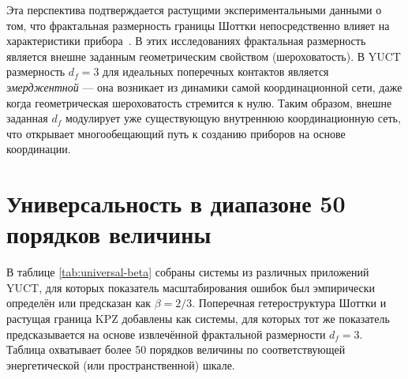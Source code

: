 \documentclass[12pt,a4paper]{article}
\begin{document}
	Эта перспектива подтверждается растущими экспериментальными данными о том,
	что фрактальная размерность границы Шоттки непосредственно влияет на
	характеристики прибора~\cite{FractalSchottky}. В этих исследованиях
	фрактальная размерность является внешне заданным геометрическим свойством
	(шероховатость). В YUCT размерность $d_f = 3$ для идеальных поперечных
	контактов является \emph{эмерджентной} — она возникает из динамики самой
	координационной сети, даже когда геометрическая шероховатость стремится
	к нулю. Таким образом, внешне заданная $d_f$ модулирует уже существующую
	внутреннюю координационную сеть, что открывает многообещающий путь к
	созданию приборов на основе координации.
	
	\section{Универсальность в диапазоне 50 порядков величины}
	В таблице \ref{tab:universal-beta} собраны системы из различных приложений
	YUCT, для которых показатель масштабирования ошибок был эмпирически
	определён или предсказан как $\beta = 2/3$. Поперечная гетероструктура
	Шоттки и растущая граница KPZ добавлены как системы, для которых тот же
	показатель предсказывается на основе извлечённой фрактальной размерности
	$d_f = 3$. Таблица охватывает более 50 порядков величины по соответствующей
	энергетической (или пространственной) шкале.
	
\end{document}
